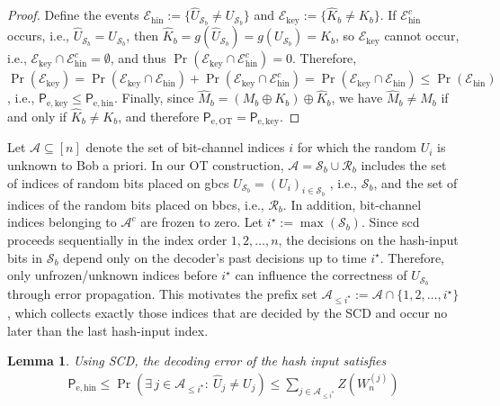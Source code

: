 \documentclass[onecolumn]{IEEEtran} %
\newcommand{\1}{\mathbbm{1}}
\theoremstyle{boldremark}
\newtheorem{lemma}{Lemma}
\begin{document}
\begin{proof}
Define the events
\(\mathcal{E}_{\mathrm{hin}}:=\{\widehat U_{\mathcal{S}_b}\neq U_{\mathcal{S}_b}\}\)
and \(\mathcal{E}_{\mathrm{key}}:=\{\widehat K_b\neq K_b\}\).
If \(\mathcal{E}_{\mathrm{hin}}^c\) occurs, i.e., \(\widehat U_{\mathcal{S}_b}=U_{\mathcal{S}_b}\), then
\(\widehat K_b=g(\widehat U_{\mathcal{S}_b})=g(U_{\mathcal{S}_b})=K_b\), so
\(\mathcal{E}_{\mathrm{key}}\) cannot occur, i.e.,
\(\mathcal{E}_{\mathrm{key}}\cap \mathcal{E}_{\mathrm{hin}}^c=\emptyset\), and thus
\(\Pr(\mathcal{E}_{\mathrm{key}}\cap \mathcal{E}_{\mathrm{hin}}^c)=0\).
Therefore,
\(\Pr(\mathcal{E}_{\mathrm{key}})
=\Pr(\mathcal{E}_{\mathrm{key}}\cap \mathcal{E}_{\mathrm{hin}})
+\Pr(\mathcal{E}_{\mathrm{key}}\cap \mathcal{E}_{\mathrm{hin}}^c)
=\Pr(\mathcal{E}_{\mathrm{key}}\cap \mathcal{E}_{\mathrm{hin}})
\le \Pr(\mathcal{E}_{\mathrm{hin}})\),
i.e., \(\textsf{P}_{\mathrm{e,key}}\le \textsf{P}_{\mathrm{e,hin}}\).
Finally, since \(\widehat M_b=(M_b\oplus K_b)\oplus \widehat K_b\), we have
\(\widehat M_b\neq M_b\) if and only if \(\widehat K_b\neq K_b\), and therefore
\(\textsf{P}_{\mathrm{e,OT}}=\textsf{P}_{\mathrm{e,key}}\).
\end{proof}



Let $\mathcal{A}\subseteq[n]$ denote the set of bit-channel indices $i$ for which the random $U_i$ is unknown to Bob a priori. In our OT construction, $\mathcal{A}=\mathcal{S}_b\cup\mathcal{R}_b$ includes the set of indices of random bits placed on \gls{gbcs} $U_{\mathcal{S}_b}=(U_i)_{i\in\mathcal{S}_b}$ , i.e., $\mathcal{S}_b$, and the set of indices of the random bits placed on \gls{bbcs}, i.e., $\mathcal{R}_b$. In addition, bit-channel indices belonging to $\mathcal{A}^c$ are frozen to zero. Let $i^\star:=\max(\mathcal{S}_b)$. Since \gls{scd} proceeds sequentially in the index order $1,2,\dots,n$, the decisions on the hash-input bits in $\mathcal{S}_b$ depend only on the decoder's past decisions up to time $i^\star$. Therefore, only unfrozen/unknown indices before $i^\star$ can influence the correctness of $\widehat U_{\mathcal{S}_b}$ through error propagation. This motivates the prefix set
$\mathcal{A}_{\le i^\star}:=\mathcal{A}\cap\{1,2,\dots,i^\star\}$, which collects exactly those indices that are decided by the SCD and occur no later than the last hash-input index.


\begin{lemma}\label{lem:prefix-bound}
Using SCD, the decoding error of the hash input satisfies
\begin{align}
    \textsf{P}_{\mathrm{e,hin}}    \le \Pr(\exists\,j\in\mathcal{A}_{\le i^\star}:\ \widehat U_j\neq U_j)
    \le \sum_{j\in\mathcal{A}_{\le i^\star}} Z(W_n^{(j)})    
\end{align}

\end{lemma}
\end{document}
